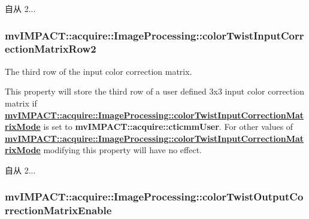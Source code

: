\begin{DoxySince}{自从}
2... 
\end{DoxySince}
\hypertarget{classmv_i_m_p_a_c_t_1_1acquire_1_1_image_processing_afb2992733955b923314845678c335e77}{
\subsubsection[{color\+Twist\+Input\+Correction\+Matrix\+Row2}]{ mv\+I\+M\+P\+A\+C\+T\+::acquire\+::\+Image\+Processing\+::color\+Twist\+Input\+Correction\+Matrix\+Row2}}\label{classmv_i_m_p_a_c_t_1_1acquire_1_1_image_processing_afb2992733955b923314845678c335e77}


The third row of the input color correction matrix. 

This property will store the third row of a user defined 3x3 input color correction matrix if {\bfseries \hyperlink{classmv_i_m_p_a_c_t_1_1acquire_1_1_image_processing_a7af8df48fdaec0dd1a1dd6edff1a13cd}{mv\+I\+M\+P\+A\+C\+T\+::acquire\+::\+Image\+Processing\+::color\+Twist\+Input\+Correction\+Matrix\+Mode}} is set to {\bfseries mv\+I\+M\+P\+A\+C\+T\+::acquire\+::cticmm\+User}. For other values of {\bfseries \hyperlink{classmv_i_m_p_a_c_t_1_1acquire_1_1_image_processing_a7af8df48fdaec0dd1a1dd6edff1a13cd}{mv\+I\+M\+P\+A\+C\+T\+::acquire\+::\+Image\+Processing\+::color\+Twist\+Input\+Correction\+Matrix\+Mode}} modifying this property will have no effect.

\begin{DoxySince}{自从}
2... 
\end{DoxySince}
\hypertarget{classmv_i_m_p_a_c_t_1_1acquire_1_1_image_processing_aa30358eeb33f8d1b26cbafc37e829c08}{
\subsubsection[{color\+Twist\+Output\+Correction\+Matrix\+Enable}]{ mv\+I\+M\+P\+A\+C\+T\+::acquire\+::\+Image\+Processing\+::color\+Twist\+Output\+Correction\+Matrix\+Enable}}\label{classmv_i_m_p_a_c_t_1_1acquire_1_1_image_processing_aa30358eeb33f8d1b26cbafc37e829c08}


